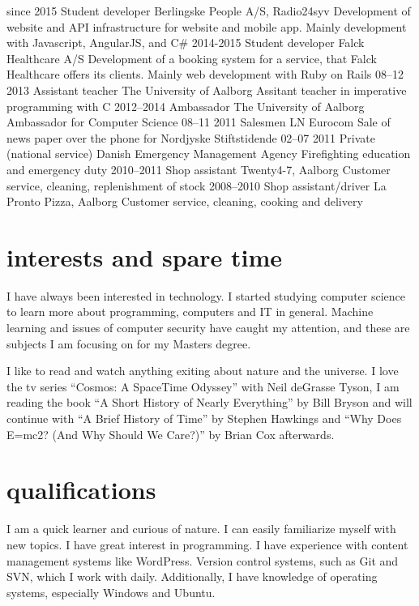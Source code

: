 \documentclass[print]{friggeri-cv}
\begin{document}
\begin{entrylist}
  \entry
    {since 2015}
    {Student developer}
    {Berlingske People A/S, Radio24syv}
    {Development of website and API infrastructure for website and mobile app. Mainly development with Javascript, AngularJS, and C\#}
  \entry
    {2014-2015}
    {Student developer}
    {Falck Healthcare A/S}
    {Development of a booking system for a service, that Falck Healthcare offers its clients. Mainly web development with Ruby on Rails}
  \entry
    {08–12 2013}
    {Assistant teacher}
    {The University of Aalborg}
    {Assitant teacher in imperative programming with C}
  \entry
    {2012–2014}
    {Ambassador}
    {The University of Aalborg}
    {Ambassador for Computer Science}
  \entry
    {08–11 2011}
    {Salesmen}
    {LN Eurocom}
    {Sale of news paper over the phone for Nordjyske Stiftstidende}
  \entry
    {02–07 2011}
    {Private (national service)}
    {Danish Emergency Management Agency}
    {Firefighting education and emergency duty}
  \entry
    {2010–2011}
    {Shop assistant}
    {Twenty4-7, Aalborg}
    {Customer service, cleaning, replenishment of stock}
  \entry
    {2008–2010}
    {Shop assistant/driver}
    {La Pronto Pizza, Aalborg}
    {Customer service, cleaning, cooking and delivery}
\end{entrylist}

\section{interests and spare time}
I have always been interested in technology. I started studying computer science to learn more about programming, computers and IT in general. Machine learning and issues of computer security have caught my attention, and these are subjects I am focusing on for my Masters degree.

I like to read and watch anything exiting about nature and the universe. I love the tv series ``Cosmos: A SpaceTime Odyssey'' with Neil deGrasse Tyson, I am reading the book ``A Short History of Nearly Everything'' by Bill Bryson and will continue with ``A Brief History of Time'' by Stephen Hawkings and ``Why Does E=mc2? (And Why Should We Care?)'' by Brian Cox afterwards.

\section{qualifications}

I am a quick learner and curious of nature. I can easily familiarize myself with new topics. I have great interest in programming. I have experience with content management systems like WordPress. Version control systems, such as Git and SVN, which I work with daily. Additionally, I have knowledge of operating systems, especially Windows and Ubuntu.
\end{document}
